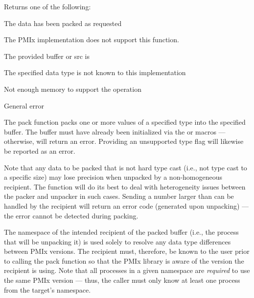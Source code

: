 Returns one of the following:
\begin{constantdesc}
\item {} The data has been packed as requested
\item {} The \ac{PMIx} implementation does not support this function.
\item {} The provided buffer or src is 
\item {} The specified data type is not known to this implementation
\item {} Not enough memory to support the operation
\item {} General error
\end{constantdesc}

\descr

The pack function packs one or more values of a specified type into the specified buffer.  The buffer must have already been
initialized via the  or 
macros --- otherwise,  will return an error.
Providing an unsupported type flag will likewise be reported as an error.

Note that any data to be packed that is not hard type cast (i.e.,
not type cast to a specific size) may lose precision when unpacked
by a non-homogeneous recipient.  The  function will do its best to deal
with heterogeneity issues between the packer and unpacker in such
cases. Sending a number larger than can be handled by the recipient
will return an error code (generated upon unpacking) ---
the error cannot be detected during packing.

The namespace of the intended recipient of the packed buffer (i.e., the
process that will be unpacking it) is used solely to resolve any data type
differences between \ac{PMIx} versions. The recipient must, therefore, be
known to the user prior to calling the pack function so that the
\ac{PMIx} library is aware of the version the recipient is using. Note that
all processes in a given namespace are \textit{required} to use the same \ac{PMIx}
version --- thus, the caller must only know at least one process from the
target's namespace.


\subsection{}

